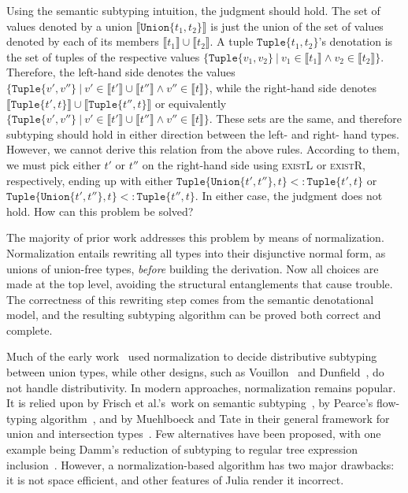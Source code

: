 \documentclass[a4paper,english]{lipics-v2019}
\newcommand{\xt}[1]{\texttt{#1}}
\newcommand{\union}[2]{\xt{Union\{}#1,#2\xt{\}}}
\newcommand{\denotes}[1]{\llbracket #1 \rrbracket}
\newcommand{\sub}{<:}
\newcommand{\tuple}[1]{\xt{Tuple\{}#1\xt{\}}}
\begin{document}
\noindent Using the semantic subtyping intuition, the judgment should hold.
The set of values denoted by a union {\small $\denotes{\union{t_1}{t_2}}$} is
just the union of the set of values denoted by each of its members {\small
$\denotes{t_1} \cup \denotes{t_2}$}. A tuple {\small $\tuple{t_1,t_2}$}'s
denotation is the set of tuples of the respective values {\small
$\{\tuple{v_1,v_2}~|~v_1 \in \denotes{t_1} \wedge v_2\in\denotes{t_2}\}$}.
Therefore, the left-hand side denotes the values {\small $\{\tuple{v',v''} ~|~
v' \in  \llbracket t' \rrbracket \cup \llbracket t'' \rrbracket \wedge v'' \in
\llbracket t \rrbracket\}$}, while the right-hand side denotes {\small
$\llbracket \tuple{t', t} \rrbracket \cup \llbracket \tuple{t'', t}
\rrbracket$} or equivalently {\small $\{\tuple{v',v''} ~|~ v' \in  \llbracket
t' \rrbracket \cup \llbracket t'' \rrbracket \wedge v'' \in \llbracket t
\rrbracket\}$}. These sets are the same, and therefore subtyping should hold
in either direction between the left- and right- hand types. However, we cannot
derive this relation from the above rules. According to them, we must pick
either {\small $t'$} or {\small $t''$} on the right-hand side using \textsc{existL} or
\textsc{existR}, respectively, ending up with either {\small $\tuple{\union{t'}{t''},
t} \sub \tuple{t', t}$} or {\small $\tuple{\union{t'}{t''}, t} \sub
\tuple{t'', t}$}. In either case, the judgment does not hold. How can this
problem be solved?

The majority of prior work addresses this problem by means of normalization.
Normalization entails rewriting all types into their disjunctive normal form,
as unions of union-free types, \emph{before} building the derivation. Now all
choices are made at the top level, avoiding the structural entanglements that
cause trouble. The correctness of this rewriting step comes from the semantic
denotational model, and the resulting subtyping algorithm can be proved both
correct and complete.

Much of the early work~\cite{barbanera1991intersection,Pierce1991,aiken1991implementing} used
normalization to decide distributive subtyping between union types, while
other designs, such as Vouillon~\cite{Vouillon04} and Dunfield~\cite{DBLP:journals/jfp/Dunfield14}, do not handle distributivity. 
In modern approaches,  normalization remains popular. It is
relied upon by Frisch et al.'s\ work on semantic subtyping~\cite{Frisch08}, by Pearce's
flow-typing algorithm~\cite{DBLP:conf/vmcai/Pearce13}, and by
Muehlboeck and Tate in their general framework for union and intersection
types~\cite{muehlboeck2018empowering}. Few alternatives have been proposed, with
one example being Damm's reduction of subtyping to regular tree
expression inclusion~\cite{DBLP:conf/tacs/Damm94}. However, a normalization-based
algorithm has two major drawbacks: it is not space efficient, and
other features of Julia render it incorrect.
\end{document}
